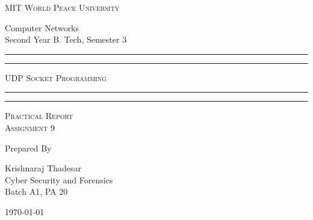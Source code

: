 \documentclass[11pt]{article}
\begin{document}
	
	\begin{titlepage} 
		\centering 
		
		
		\huge\textsc{
			MIT World Peace University
		}\\
	
		\vspace{0.75\baselineskip} %
		
		\LARGE{
			Computer Networks\\
			Second Year B. Tech, Semester 3
		}
		
		\vfill %
		
		
		\rule{\textwidth}{1.6pt}\vspace*{-\baselineskip}\vspace*{2pt}
		\rule{\textwidth}{0.6pt}
		\vspace{0.75\baselineskip} %
		
		
		
		\huge{\textsc{
			UDP Socket Programming
			}} \\
		
		
		
		\vspace{0.5\baselineskip} %
		\rule{\textwidth}{0.6pt}\vspace*{-\baselineskip}\vspace*{2.8pt}
		\rule{\textwidth}{1.6pt}
		
		\vspace{1\baselineskip} %

			
		\LARGE\textsc{
			Practical Report\\
			Assignment 9
		} %
		\vfill
		
		
		Prepared By
		\vspace{0.5\baselineskip} %
		
		\Large{
			Krishnaraj Thadesar \\
			Cyber Security and Forensics\\
			Batch A1, PA 20
		}
		
		
		\vspace{0.5\baselineskip} %
		\today

	\end{titlepage}
	
\end{document}
